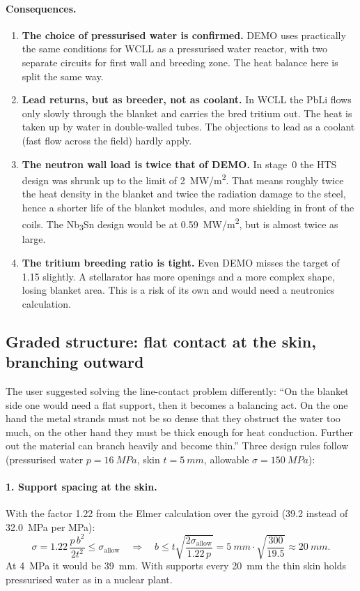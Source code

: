 \documentclass[10pt,a4paper]{article}
\begin{document}
\paragraph{Consequences.}
\begin{enumerate}\itemsep1pt
\item \textbf{The choice of pressurised water is confirmed.} DEMO uses practically the same conditions for WCLL as a
  pressurised water reactor, with two separate circuits for first wall and breeding zone. The heat balance here is
  split the same way.
\item \textbf{Lead returns, but as breeder, not as coolant.} In WCLL the PbLi flows only slowly through the blanket
  and carries the bred tritium out. The heat is taken up by water in double-walled tubes. The objections to lead as
  a coolant (fast flow across the field) hardly apply.
\item \textbf{The neutron wall load is twice that of DEMO.} In stage~0 the HTS design was shrunk up to the limit of
  \SI{2}{MW/m^2}. That means roughly twice the heat density in the blanket and twice the radiation damage to the
  steel, hence a shorter life of the blanket modules, and more shielding in front of the coils. The
  Nb\textsubscript{3}Sn design would be at \SI{0.59}{MW/m^2}, but is almost twice as large.
\item \textbf{The tritium breeding ratio is tight.} Even DEMO misses the target of 1.15 slightly. A stellarator has
  more openings and a more complex shape, losing blanket area. This is a risk of its own and would need a neutronics
  calculation.
\end{enumerate}

\subsection{Graded structure: flat contact at the skin, branching outward}
The user suggested solving the line-contact problem differently: ``On the blanket side one would need a flat
support, then it becomes a balancing act. On the one hand the metal strands must not be so dense that they obstruct
the water too much, on the other hand they must be thick enough for heat conduction. Further out the material can
branch heavily and become thin.'' Three design rules follow (pressurised water $p = \SI{16}{MPa}$, skin
$t = \SI{5}{mm}$, allowable $\sigma = \SI{150}{MPa}$):

\paragraph{1. Support spacing at the skin.} With the factor 1.22 from the Elmer calculation over the gyroid
(\SI{39.2}{} instead of \SI{32.0}{MPa} per MPa):
\[ \sigma = 1.22\,\frac{p\,b^2}{2t^2} \le \sigma_\text{allow}\quad\Rightarrow\quad
   b \le t\sqrt{\frac{2\sigma_\text{allow}}{1.22\,p}} = \SI{5}{mm}\cdot\sqrt{\frac{300}{19.5}} \approx \SI{20}{mm}. \]
At \SI{4}{MPa} it would be \SI{39}{mm}. With supports every \SI{20}{mm} the thin skin holds pressurised water as in a
nuclear plant.
\end{document}
